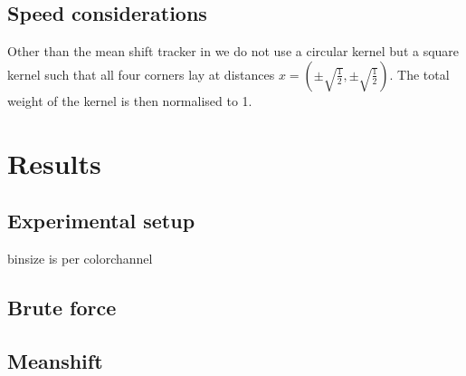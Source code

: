 \documentclass[a4paper,11pt]{article}
\begin{document}
\subsection{Speed considerations}



Other than the mean shift tracker in \cite{mean_shift} we do not use a circular kernel but a square kernel such that all four corners lay at distances $x=(\pm \sqrt{\frac{1}{2}},\pm \sqrt{\frac{1}{2}})$. The total weight of the kernel is then normalised to 1.

\section{Results} 

	\subsection{Experimental setup} 

	binsize is per colorchannel

	\subsection{Brute force} 

	\subsection{Meanshift} 
\end{document}
